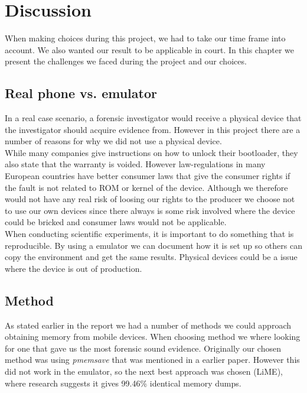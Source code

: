 \section{Discussion}
When making choices during this project, we had to take our time frame into account. 
We also wanted our result to be applicable in court. In this chapter we present the 
challenges we faced during the project and our choices.

\subsection{Real phone vs. emulator}
In a real case scenario, a forensic investigator would receive a physical device 
that the investigator should acquire evidence from. However in this project there 
are a number of reasons for why we did not use a physical device.\\

While many companies give instructions on how to unlock their bootloader, they also 
state that the warranty is voided. However law-regulations in many European countries 
have better consumer laws that give the consumer rights if the fault %
is not related to ROM or kernel of the device. Although we therefore would not have 
any real risk of loosing our rights to the producer we choose not to use our own 
devices since there always is some risk involved where the device could be bricked 
and consumer laws would not be applicable.\\

When conducting scientific experiments, it is important to do something that is 
reproducible. By using a emulator we can document how it is set up so others can 
copy the environment and get the same results. Physical devices could be a issue 
where the device is out of production.

\subsection{Method}
As stated earlier in the report we had a number of methods we could approach 
obtaining memory from mobile devices. When choosing method we where looking for one 
that gave us the most forensic sound evidence. Originally our chosen method was 
using \textit{pmemsave} %
that was mentioned in a earlier paper\cite{acq_vol_android_mem}. However this did 
not work in the emulator, so the next best approach was chosen (LiME), where research suggests 
it gives 99.46\% identical memory dumps\cite{acq_vol_android_mem}.

